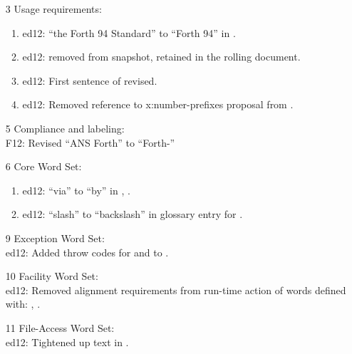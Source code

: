 \begin{itemize}
	\item[3] Usage requirements:					%
		\begin{enumerate}
		\item \textsf{ed12}: ``the Forth 94 Standard'' to ``Forth 94'' in .
		\item \textsf{ed12}:  removed from snapshot,
			retained in the rolling document.
		\item \textsf{ed12}: First sentence of  revised.
		\item \textsf{ed12}: Removed reference to \textsf{x:number-prefixes} proposal from .
		\end{enumerate}


	\item[5] Compliance and labeling:			%
		\\ \textsf{F12}: Revised ``ANS Forth'' to ``Forth-\snapshot''

	\item[6] Core Word Set:							%
		\begin{enumerate}
		\item \textsf{ed12}: ``via'' to ``by'' in , .
		\item \textsf{ed12}: ``slash'' to ``backslash'' in glossary entry for .
		\end{enumerate}

	\item[9] Exception Word Set:					%
		\\ \textsf{ed12}: Added throw codes for  and 
			to .

	\item[10] Facility Word Set:					%
		\\ \textsf{ed12}: Removed alignment requirements from run-time action of
			words defined with:
			,
			.

	\item[11] File-Access Word Set:				%
		\\ \textsf{ed12}: Tightened up text in .


\end{itemize}
